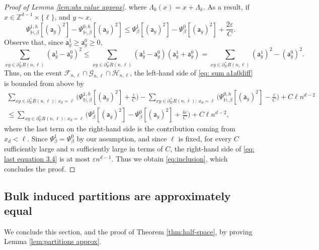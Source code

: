 \documentclass[11pt,a4paper]{article}
\numberwithin{equation}{section}
\theoremstyle{plain}
\theoremstyle{definition}
\begin{document}
\begin{proof}[Proof of Lemma \textup{\ref{lem:abs value approx}}]
where $\Lambda_k(x) = x + \Lambda_k$. As a result, if $x \in \mathbb Z^{d-1}\times \{\ell\}$, and $y\sim x$,
\begin{equation}
   \Psi^{1,h}_{\mathbb H,\beta}[(\mathsf a_y)^2] - \Psi^{0,h}_{\mathbb H, \beta}[(\mathsf a_y)^2] \leq \Psi^{1}_{\beta}[(\mathsf a_y)^2] - \Psi^{0}_{\beta}[(\mathsf a_y)^2]  + \frac{2\varepsilon}{C}.
\end{equation}
Observe that, since $\mathsf{a}^1_y\geq \mathsf{a}^0_y\geq 0$,
\begin{equation}\label{eq: sum a1a0diff}
\sum_{xy\in \partial^+_E R(n,\ell)} (\mathsf a^1_y - \mathsf a^0_y)^2 \leq \sum_{xy\in \partial^+_E R(n,\ell)} (\mathsf a^1_y - \mathsf a^0_y)(\mathsf a^1_y+\mathsf a^0_y)=\sum_{xy\in \partial^+_E R(n,\ell)} (\mathsf a^1_y)^2 - (\mathsf a^0_y)^2. 
\end{equation}
Thus, on the event $\mathcal F_{n,\ell} \cap \mathcal G_{n,\ell}\cap \mathcal H_{n,\ell}$, the left-hand side of \eqref{eq: sum a1a0diff} is bounded from above by
\begin{multline}\label{eq: last equation 3.4}
\sum_{xy\in \partial^+_E R(n,\ell): \: x_d=\ell} \Big(\Psi^{1,h}_{\mathbb{H},\beta}[(\mathsf{a}_y)^2]+\frac{\varepsilon}{C}\Big)-\sum_{xy\in \partial^+_E R(n,\ell): \: x_d=\ell} \Big(\Psi^{0,h}_{\mathbb{H},\beta}[(\mathsf{a}_y)^2]-\frac{\varepsilon}{C}\Big)+C\ell n^{d-2}\\\leq \sum_{xy\in \partial^+_E R(n,\ell):\: x_d=\ell} \Big(\Psi^{1}_{\beta}[(\mathsf{a}_y)^2]-\Psi^{0}_{\beta}[(\mathsf{a}_y)^2] +\frac{4\varepsilon}{C}\Big)+C\ell n^{d-2},
\end{multline}
where the last term on the right-hand side is the contribution coming from $x_d<\ell$. 
Since $\Psi^1_{\beta}=\Psi^0_{\beta}$ by our assumption, and since $\ell$ is fixed, for every $C$ sufficiently large and $n$ sufficiently large in terms of $C$, the right-hand side of \eqref{eq: last equation 3.4} is at most $\varepsilon n^{d-1}$. Thus
we obtain \eqref{eq:inclusion}, which concludes the proof.
\end{proof}



\subsection{Bulk induced partitions are approximately equal}


We conclude this section, and the proof of Theorem \ref{thm:half-space}, by proving Lemma \ref{lem:partitions approx}. 
\end{document}
